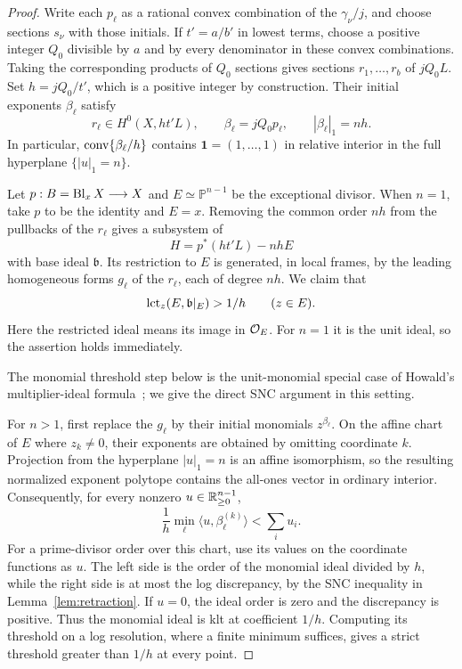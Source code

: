 \begin{proof}
Write each $p_\ell$ as a rational convex combination of the
$\gamma_\nu/j$, and choose sections $s_\nu$ with those initials.
If $t'=a/b'$ in lowest terms, choose a positive integer $Q_0$ divisible
by $a$ and by every denominator in these convex combinations. Taking
the corresponding products of $Q_0$ sections gives sections
$r_1,\ldots,r_b$ of $jQ_0L$. Set $h=jQ_0/t'$, which is a positive
integer by construction. Their initial exponents $\beta_\ell$ satisfy
\begin{equation}
\label{eq:min-product-initials}
 r_\ell\in H^0(X,ht'L),\qquad
 \beta_\ell=jQ_0p_\ell,\qquad |\beta_\ell|_1=nh.
\end{equation}
In particular, $\operatorname{conv}\{\beta_\ell/h\}$ contains
$\mathbf1=(1,\ldots,1)$ in relative interior in the full hyperplane
$\{|u|_1=n\}$.

Let $p:B=\operatorname{Bl}_xX\longrightarrow X$ and
$E\simeq\mathbb P^{n-1}$ be the exceptional divisor. When $n=1$, take
$p$ to be the identity and $E=x$. Removing the common order $nh$ from
the pullbacks of the $r_\ell$ gives a subsystem of
\[
 H=p^*(ht'L)-nhE
\]
with base ideal $\mathfrak b$. Its restriction to $E$ is generated,
in local frames, by the leading homogeneous forms $g_\ell$ of the
$r_\ell$, each of degree $nh$. We claim that
\begin{equation}
\label{eq:min-restricted-threshold}
 \operatorname{lct}_z(E,\mathfrak b|_E)>1/h\qquad(z\in E).
\end{equation}
Here the restricted ideal means its image in $\mathcal O_E$. For $n=1$ it
is the unit ideal, so the assertion holds immediately.

The monomial threshold step below is the unit-monomial special case
of Howald's multiplier-ideal formula~\cite[Main Theorem]{howald2001};
we give the direct SNC argument in this setting.

For $n>1$, first replace the $g_\ell$ by their initial monomials
$z^{\beta_\ell}$. On the affine chart of $E$ where $z_k\ne0$, their
exponents are obtained by omitting coordinate $k$. Projection from
the hyperplane $|u|_1=n$ is an affine isomorphism, so the resulting
normalized exponent polytope contains the all-ones vector in ordinary
interior. Consequently, for every nonzero
$u\in\mathbb R_{\geq0}^{n-1}$,
\begin{equation}
\label{eq:min-monomial-strict}
 \frac1h\min_\ell\langle u,\beta_\ell^{(k)}\rangle
       <\sum_i u_i.
\end{equation}
For a prime-divisor order over this chart, use its values on the
coordinate functions as $u$. The left side is the order of the
monomial ideal divided by $h$, while the right side is at most the log
discrepancy, by the SNC inequality in Lemma~\ref{lem:retraction}. If
$u=0$, the ideal order is zero and the discrepancy is positive. Thus
the monomial ideal is klt at coefficient $1/h$. Computing its threshold
on a log resolution, where a finite minimum suffices, gives a strict
threshold greater than $1/h$ at every point.


\end{proof}
